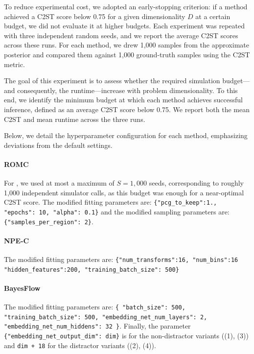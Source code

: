 To reduce experimental cost, we adopted an early-stopping criterion: if a method achieved a C2ST score below 0.75 for a given dimensionality $D$ at a certain budget, we did not evaluate it at higher budgets. Each experiment was repeated with three independent random seeds, and we report the average C2ST scores across these runs.
For each method, we drew 1{,}000 samples from the approximate posterior and compared them against 1{,}000 ground-truth samples using the C2ST metric.

The goal of this experiment is to assess whether the required simulation budget---and consequently, the runtime---increase with problem dimensionality. To this end, we identify the minimum budget at which each method achieves successful inference, defined as an average C2ST score below 0.75. We report both the mean C2ST and mean runtime across the three runs.

Below, we detail the hyperparameter configuration for each method, emphasizing deviations from the default settings.

\paragraph{ROMC} 
For \rromc, we used at most a maximum of $S = 1{,}000$ seeds, corresponding to roughly 1{,}000 independent simulator calls, as this budget was enough for a near-optimal C2ST score.
The modified fitting parameters are: \texttt{\{"pcg\_to\_keep":1., "epochs": 10, "alpha": 0.1\}} and the modified sampling parameters are: \texttt{\{"samples\_per\_region": 2\}}.

\paragraph{NPE-C} 
The modified fitting parameters are:
\texttt{\{"num\_transforms":16, "num\_bins":16 "hidden\_features":200, "training\_batch\_size": 500\}}

\paragraph{BayesFlow} 

The modified fitting parameters are:
\texttt{\{
  "batch\_size": 500,
  "training\_batch\_size": 500,
  "embedding\_net\_num\_layers": 2,
  "embedding\_net\_num\_hiddens": 32
  \}}.
Finally, the parameter
\texttt{\{"embedding\_net\_output\_dim": dim\}} is for the non-distractor variants ((1), (3)) and \texttt{dim + 18} for the distractor variants ((2), (4)).

